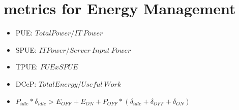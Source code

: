 \section{metrics for Energy Management}
\begin{itemize}
    \item PUE: \(Total Power / IT\ Power\)
    \item SPUE: \(IT Power / Server\ Input\ Power\)
    \item TPUE: \(PUE x SPUE\)
    \item DCeP: \(Total Energy / Useful\ Work \)
    \item \(P_{idle} * \delta_{idle} > E_{OFF} + E_{ON} + P_{OFF}*(\delta_{idle} + \delta_{OFF} + \delta_{ON}) \)
\end{itemize}
